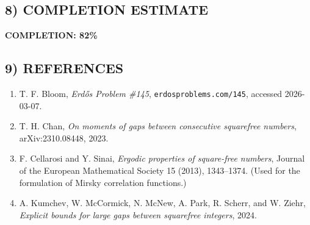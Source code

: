 \subsection*{8) COMPLETION ESTIMATE}

\textbf{COMPLETION: 82\%}

\subsection*{9) REFERENCES}

\begin{enumerate}
\item T. F. Bloom, \emph{Erd\H{o}s Problem \#145}, \texttt{erdosproblems.com/145}, accessed 2026-03-07.
\item T. H. Chan, \emph{On moments of gaps between consecutive squarefree numbers}, arXiv:2310.08448, 2023.
\item F. Cellarosi and Y. Sinai, \emph{Ergodic properties of square-free numbers}, Journal of the European Mathematical Society 15 (2013), 1343--1374. (Used for the formulation of Mirsky correlation functions.)
\item A. Kumchev, W. McCormick, N. McNew, A. Park, R. Scherr, and W. Ziehr, \emph{Explicit bounds for large gaps between squarefree integers}, 2024.
\end{enumerate}

\newpage
